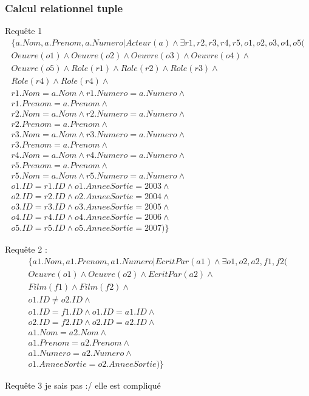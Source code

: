 \documentclass[10pt,a4paper]{article}
\begin{document}
\subsubsection{Calcul relationnel tuple}

\begin{list}{*}{}
\item Requête 1
\noindent
\[\begin{aligned}
      \{ a.Nom, a.Prenom, a.Numero | Acteur(a) \wedge \exists r1, r2, r3, r4, r5, o1, o2, o3, o4, o5 ( \\
       Oeuvre(o1) \wedge Oeuvre(o2) \wedge Oeuvre(o3) \wedge Oeuvre(o4) \wedge \\
       Oeuvre(o5) \wedge Role(r1) \wedge Role(r2) \wedge Role(r3) \wedge \\
       Role(r4) \wedge Role(r4)\wedge \\
       r1.Nom = a.Nom \wedge r1.Numero = a.Numero \wedge \\
       r1.Prenom = a.Prenom \wedge \\
       r2.Nom = a.Nom \wedge r2.Numero = a.Numero \wedge \\
       r2.Prenom = a.Prenom \wedge \\
       r3.Nom = a.Nom \wedge r3.Numero = a.Numero \wedge \\
       r3.Prenom = a.Prenom \wedge \\
       r4.Nom = a.Nom \wedge r4.Numero = a.Numero \wedge \\
       r5.Prenom = a.Prenom \wedge \\
       r5.Nom = a.Nom \wedge r5.Numero = a.Numero \wedge \\
       o1.ID = r1.ID \wedge o1.AnneeSortie = 2003 \wedge \\
       o2.ID = r2.ID \wedge o2.AnneeSortie = 2004 \wedge \\
       o3.ID = r3.ID \wedge o3.AnneeSortie = 2005 \wedge \\
       o4.ID = r4.ID \wedge o4.AnneeSortie = 2006 \wedge \\
       o5.ID = r5.ID \wedge o5.AnneeSortie = 2007) \}
\end{aligned}\]
\item Requête 2 :
\noindent
\[\begin{aligned}
\{ a1.Nom, a1.Prenom, a1.Numero | EcritPar(a1) \wedge \exists o1, o2, a2, f1, f2 ( \\
      Oeuvre(o1) \wedge Oeuvre(o2) \wedge EcritPar(a2) \wedge \\
       Film(f1) \wedge Film(f2) \wedge \\
       o1.ID \neq o2.ID \wedge \\
       o1.ID = f1.ID \wedge o1.ID = a1.ID \wedge \\
       o2.ID = f2.ID \wedge o2.ID = a2.ID \wedge \\
       a1.Nom = a2.Nom \wedge \\
       a1.Prenom = a2.Prenom \wedge \\
       a1.Numero = a2.Numero \wedge \\
       o1.AnneeSortie = o2.AnneeSortie) \}
\end{aligned}\]
\item Requête 3 je sais pas :/ elle est compliqué


\end{list}
\end{document}
